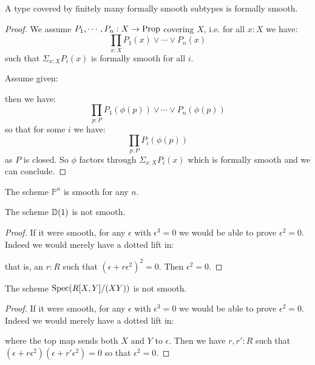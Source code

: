 \begin{lemma}
A type covered by finitely many formally smooth subtypes is formally smooth.
\end{lemma}
\begin{proof}
We assume $P_1,\cdots,P_n:X\to \mathrm{Prop}$ covering $X$, i.e. for all $x:X$ we have:
\[
\prod_{x:X}P_1(x)\lor\cdots\lor P_n(x)
\]
such that $\Sigma_{x:X}P_i(x)$ is formally smooth for all $i$.

Assume given:
   \begin{center}
    \end{center}
   then we have:
   \[\prod_{p:P} P_1(\phi(p))\lor\cdots\lor P_n(\phi(p))\]
   so that for some $i$ we have:
      \[\prod_{p:P} P_i(\phi(p))\]
as $P$ is closed. So $\phi$ factors through $\Sigma_{x:X}P_i(x)$ which is formally smooth and we can conclude. %
\end{proof}

\begin{corollary}
The scheme $\mathbb{P}^n$ is smooth for any $n$.
\end{corollary}

\begin{lemma}
The scheme $\mathbb{D}(1)$ is not smooth.
\end{lemma}

\begin{proof}
If it were smooth, for any $\epsilon$ with $\epsilon^3=0$ we would be able to prove $\epsilon^2=0$.
Indeed we would merely have a dotted lift in:
 \begin{center}
    \end{center}
    that is, an $r:R$ such that $(\epsilon+r\epsilon^2)^2=0$. Then $\epsilon^2=0$.
\end{proof}

\begin{lemma}
The scheme $\operatorname{Spec}(R[X,Y]/(XY))$ is not smooth.
\end{lemma}

\begin{proof}
If it were smooth, for any $\epsilon$ with $\epsilon^3=0$ we would be able to prove $\epsilon^2=0$.
Indeed we would merely have a dotted lift in:
 \begin{center}
    \end{center}
    where the top map sends both $X$ and $Y$ to $\epsilon$. Then we have $r,r':R$ such that $(\epsilon+r\epsilon^2)(\epsilon+r'\epsilon^2)=0$ so that $\epsilon^2=0$. %
\end{proof}

